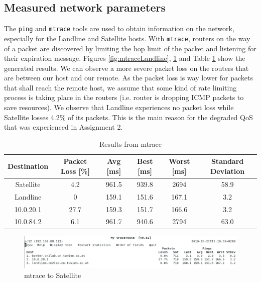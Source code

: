 \documentclass[parskip=full]{scrartcl}
\begin{document}
\subsection{Measured network parameters}

The \texttt{ping} and \texttt{mtrace} tools are used to obtain information on the network, especially for the Landline and Satellite hosts.
With \texttt{mtrace}, routers on the way of a packet are discovered by limiting the hop limit of the packet and listening for their expiration message.
Figures \ref{fig:mtraceLandline}, \ref{fig:mtraceSatellite} and Table \ref{tbl:mtraceResults} show the generated results.
We can observe a more severe packet loss on the routers that are between our host and our remote. 
As the packet loss is way lower for packets that shall reach the remote host, we assume that some kind of rate limiting process is taking place in the routers (i.e. router is dropping ICMP packets to save resources).
We observe that Landline experiences no packet loss while Satellite losses 4.2\% of its packets. 
This is the main reason for the degraded QoS that was experienced in Assignment 2.

\begin{table}[hb]
    \centering
    \caption{Results from mtrace}
    \label{tbl:mtraceResults}
    \begin{tabular}{cccccc}
        \toprule
        Destination & Packet Loss [\%] & Avg [ms] & Best [ms] & Worst [ms] & Standard Deviation  \\ \midrule
        Satellite & 4.2 & 961.5 & 939.8 & 2694 & 58.9 \\
        Landline & 0 & 159.1 & 151.6 & 167.1 & 3.2\\
        10.0.20.1 & 27.7 & 159.3 & 151.7 & 166.6 & 3.2\\
        10.0.84.2 & 6.1 & 961.7 & 940.6 & 2794 & 63.0\\
        \bottomrule
    \end{tabular}
\end{table}

\begin{figure}[ht]
    \centering
   \includegraphics[width=\textwidth]{images/mytraceroute1.png} 
    \caption{mtrace to Satellite}
    \label{fig:mtraceSatellite}
\end{figure}
\end{document}
